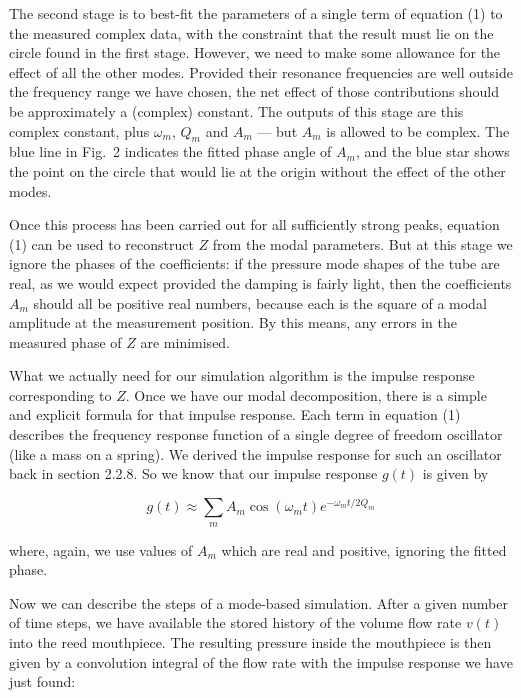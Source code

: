   The second stage is to best-fit the parameters of a single term of equation 
  (1) to the measured complex data, with the constraint that the result must 
  lie on the circle found in the first stage. However, we need to make some 
  allowance for the effect of all the other modes. Provided their resonance 
  frequencies are well outside the frequency range we have chosen, the net 
  effect of those contributions should be approximately a (complex) constant. 
  The outputs of this stage are this complex constant, plus $\omega_m$, $Q_m$ 
  and $A_m$ — but $A_m$ is allowed to be complex. The blue line in Fig.\ 2 
  indicates the fitted phase angle of $A_m$, and the blue star shows the point 
  on the circle that would lie at the origin without the effect of the other 
  modes. 

  Once this process has been carried out for all sufficiently strong peaks, 
  equation (1) can be used to reconstruct $Z$ from the modal parameters. But at 
  this stage we ignore the phases of the coefficients: if the pressure mode 
  shapes of the tube are real, as we would expect provided the damping is 
  fairly light, then the coefficients $A_m$ should all be positive real 
  numbers, because each is the square of a modal amplitude at the measurement 
  position. By this means, any errors in the measured phase of $Z$ are 
  minimised. 

  What we actually need for our simulation algorithm is the impulse response 
  corresponding to $Z$. Once we have our modal decomposition, there is a simple 
  and explicit formula for that impulse response. Each term in equation (1) 
  describes the frequency response function of a single degree of freedom 
  oscillator (like a mass on a spring). We derived the impulse response for 
  such an oscillator back in section 2.2.8. So we know that our impulse 
  response $g(t)$ is given by 

  \begin{equation*}g(t) \approx \sum_m{A_m \cos(\omega_m t) e^{-\omega_m 
  t/2Q_m}} \tag{2}\end{equation*} 

  \noindent{}where, again, we use values of $A_m$ which are real and positive, 
  ignoring the fitted phase. 

  Now we can describe the steps of a mode-based simulation. After a given 
  number of time steps, we have available the stored history of the volume flow 
  rate $v(t)$ into the reed mouthpiece. The resulting pressure inside the 
  mouthpiece is then given by a convolution integral of the flow rate with the 
  impulse response we have just found: 

